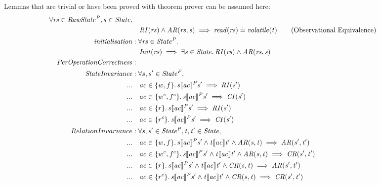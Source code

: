 \documentclass[a4paper,11pt]{article}
\theoremstyle{definition}
\begin{document}
Lemmas that are trivial or have been proved with theorem prover can be assumed here:
\begin{align*}
	\forall \mathit{rs} \in \mathit{RawState^P},s \in \mathit{State} \ldotp \\
	 & \quad \mathit{RI(rs)} \land \mathit{AR(rs, s)} \implies \mathit{read(rs)} \doteq \mathit{volatile(t)} \tag{Observational Equivalence}\\
	\mathit{initialisation} &: \forall \mathit{rs} \in \mathit{State^P} \ldotp\\
	 &\quad \mathit{Init(rs) \implies \exists s \in State \ldotp RI(rs) \land AR(rs, s)}\\
	\mathit{PerOperationCorrectness} &:\\
	 \mathit{StateInvariance} &: \forall s, s' \in \mathit{State^P},\\
	...	 &\quad \mathit{ac} \in \{w, f\} \ldotp \mathit{s \llbracket ac \rrbracket^P s' \implies RI(s')}\\
	...	 &\quad \mathit{ac} \in \{w^c, f^c\} \ldotp \mathit{s \llbracket ac \rrbracket^P s' \implies CI(s')}\\
	...	 &\quad \mathit{ac} \in \{r\} \ldotp \mathit{s \llbracket ac \rrbracket^P s' \implies RI(s')}\\
	...	 &\quad \mathit{ac} \in \{r^c\} \ldotp \mathit{s \llbracket ac \rrbracket^P s' \implies CI(s')}\\
	RelationInvariance &: \mathit{\forall s, s' \in State^P, t, t' \in State,}\\
	...	& \quad \mathit{ac} \in \{w, f\} \ldotp \mathit{s \llbracket ac \rrbracket^P s' \land t \llbracket ac \rrbracket t' \land AR(s, t) \implies AR(s', t')}\\
	...	& \quad \mathit{ac} \in \{w^c, f^c\} \ldotp \mathit{s \llbracket ac \rrbracket^P s' \land t \llbracket ac \rrbracket t' \land AR(s, t) \implies CR(s', t')}\\
	...	& \quad \mathit{ac} \in \{r\} \ldotp \mathit{s \llbracket ac \rrbracket^P s' \land t \llbracket ac \rrbracket t' \land CR(s, t) \implies AR(s', t')}\\
	...	& \quad \mathit{ac} \in \{r^c\} \ldotp \mathit{s \llbracket ac \rrbracket^P s' \land t \llbracket ac \rrbracket t' \land CR(s, t) \implies CR(s', t')}\\
\end{align*}
\end{document}
